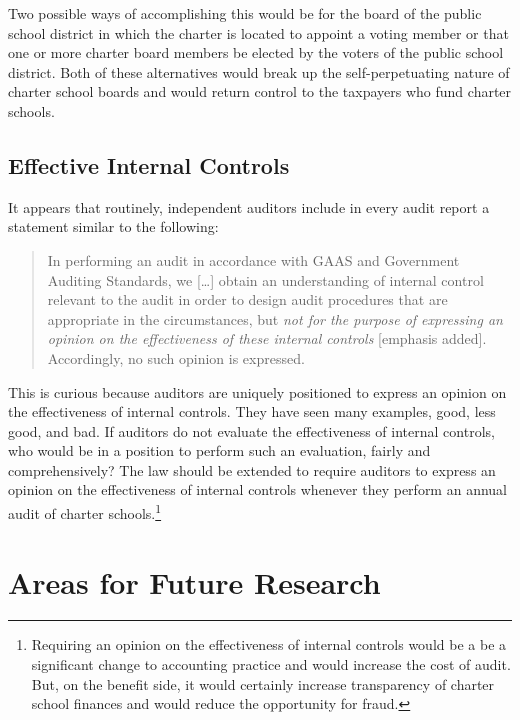Two possible ways of accomplishing this would be for the board of the public school district in which the charter is located to appoint a voting member or that one or more charter board members be elected by the voters of the public school district. Both of these alternatives would break up the self-perpetuating nature of charter school boards and would return control to the taxpayers who fund charter schools.

\subsection{Effective Internal Controls}%
\label{sec:effect-intern-contr}\indent%

It appears that routinely, independent auditors include in every audit report a statement similar to the following:

\blockquote[][]{\SingleSpacing
  In performing an audit in accordance with GAAS and Government Auditing Standards, we [\ldots]
  obtain an understanding of internal control relevant to the audit in order to design audit procedures that are appropriate in the circumstances, but \textit{not for the purpose of expressing an opinion on the effectiveness of these internal controls} [emphasis added]. Accordingly, no such opinion is expressed.}

This is curious because auditors are uniquely positioned to express an opinion on the effectiveness of internal controls. They have seen many examples, good, less good, and bad. If auditors do not evaluate the effectiveness of internal controls, who would be in a position to perform such an evaluation, fairly and comprehensively? The law should be extended to require auditors to express an opinion on the effectiveness of internal controls whenever they perform an annual audit of charter schools.\footnote{Requiring an opinion on the effectiveness of internal controls would be a be a significant change to accounting practice and would increase the cost of audit. But, on the benefit side, it would certainly increase transparency of charter school finances and would reduce the opportunity for fraud.}

\section{Areas for Future Research}%
\label{sec:areas-future-rese}\indent%

